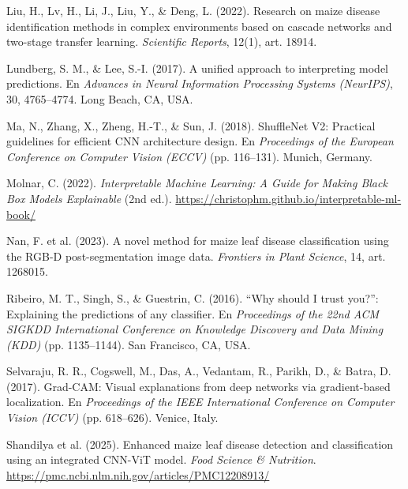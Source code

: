 \documentclass[12pt,letterpaper]{article}
\begin{document}
\par\bigskip
\noindent\hangindent=1.27cm
Liu, H., Lv, H., Li, J., Liu, Y., \& Deng, L. (2022). Research on maize disease identification methods in complex environments based on cascade networks and two-stage transfer learning. \textit{Scientific Reports}, 12(1), art. 18914.

\par\bigskip
\noindent\hangindent=1.27cm
Lundberg, S. M., \& Lee, S.-I. (2017). A unified approach to interpreting model predictions. En \textit{Advances in Neural Information Processing Systems (NeurIPS)}, 30, 4765--4774. Long Beach, CA, USA.

\par\bigskip
\noindent\hangindent=1.27cm
Ma, N., Zhang, X., Zheng, H.-T., \& Sun, J. (2018). ShuffleNet V2: Practical guidelines for efficient CNN architecture design. En \textit{Proceedings of the European Conference on Computer Vision (ECCV)} (pp. 116--131). Munich, Germany.

\par\bigskip
\noindent\hangindent=1.27cm
Molnar, C. (2022). \textit{Interpretable Machine Learning: A Guide for Making Black Box Models Explainable} (2nd ed.). \url{https://christophm.github.io/interpretable-ml-book/}

\par\bigskip
\noindent\hangindent=1.27cm
Nan, F. et al. (2023). A novel method for maize leaf disease classification using the RGB-D post-segmentation image data. \textit{Frontiers in Plant Science}, 14, art. 1268015.

\par\bigskip
\noindent\hangindent=1.27cm
Ribeiro, M. T., Singh, S., \& Guestrin, C. (2016). ``Why should I trust you?'': Explaining the predictions of any classifier. En \textit{Proceedings of the 22nd ACM SIGKDD International Conference on Knowledge Discovery and Data Mining (KDD)} (pp. 1135--1144). San Francisco, CA, USA.

\par\bigskip
\noindent\hangindent=1.27cm
Selvaraju, R. R., Cogswell, M., Das, A., Vedantam, R., Parikh, D., \& Batra, D. (2017). Grad-CAM: Visual explanations from deep networks via gradient-based localization. En \textit{Proceedings of the IEEE International Conference on Computer Vision (ICCV)} (pp. 618--626). Venice, Italy.

\par\bigskip
\noindent\hangindent=1.27cm
Shandilya et al. (2025). Enhanced maize leaf disease detection and classification using an integrated CNN-ViT model. \textit{Food Science \& Nutrition}. \url{https://pmc.ncbi.nlm.nih.gov/articles/PMC12208913/}
\end{document}
